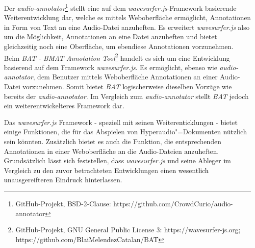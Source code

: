 Der \textit{audio-annotator}\footnote{GitHub-Projekt, BSD-2-Clause: https://github.com/CrowdCurio/audio-annotator} stellt eine auf dem \textit{wavesurfer.js}-Framework basierende Weiterentwicklung dar, welche es mittels Weboberfläche ermöglicht, Annotationen in Form von Text an eine Audio-Datei anzuheften. Es erweitert \textit{wavesurfer.js} also um die Möglichkeit, Annotationen an eine Datei anzuheften und bietet gleichzeitig noch eine Oberfläche, um ebendiese Annotationen vorzunehmen.\\
Beim \textit{BAT - BMAT Annotation Tool}\footnote{GitHub-Projekt, GNU General Public License 3: https://wavesurfer-js.org; https://github.com/BlaiMelendezCatalan/BAT} handelt es sich um eine Entwicklung basierend auf dem Framework \textit{wavesurfer.js}. Es ermöglicht, ebenso wie \textit{audio-annotator}, dem Benutzer mittels Weboberfläche Annotationen an einer Audio-Datei vorzunehmen. Somit bietet \textit{BAT} logischerweise dieselben Vorzüge wie bereits der \textit{audio-annotator}. Im Vergleich zum \textit{audio-annotator} stellt \textit{BAT} jedoch ein weiterentwickelteres Framework dar.

Das \textit{wavesurfer.js} Framework - speziell mit seinen Weiterenticklungen - bietet einige Funktionen, die für das Abspielen von Hyperaudio"=Dokumenten nützlich sein könnten. Zusätzlich bietet es auch die Funktion,  die entsprechenden Annotationen in einer Weboberfläche an die Audio-Dateien anzuheften. Grundsätzlich lässt sich feststellen, dass \textit{wavesurfer.js} und seine Ableger im Vergleich zu den zuvor betrachteten Entwicklungen einen wesentlich unausgereifteren Eindruck hinterlassen.

